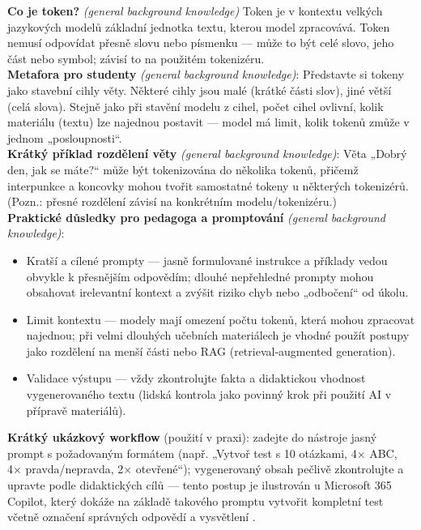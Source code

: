 
\noindent\textbf{Co je token?} \emph{(general background knowledge)} Token je v kontextu velkých jazykových modelů základní jednotka textu, kterou model zpracovává. Token nemusí odpovídat přesně slovu nebo písmenku — může to být celé slovo, jeho část nebo symbol; závisí to na použitém tokenizéru.\\

\noindent\textbf{Metafora pro studenty} \emph{(general background knowledge)}: Představte si tokeny jako stavební cihly věty. Některé cihly jsou malé (krátké části slov), jiné větší (celá slova). Stejně jako při stavění modelu z cihel, počet cihel ovlivní, kolik materiálu (textu) lze najednou postavit — model má limit, kolik tokenů zmůže v jednom „posloupnosti“.\\

\noindent\textbf{Krátký příklad rozdělení věty} \emph{(general background knowledge)}: Věta „Dobrý den, jak se máte?“ může být tokenizována do několika tokenů, přičemž interpunkce a koncovky mohou tvořit samostatné tokeny u některých tokenizérů. (Pozn.: přesné rozdělení závisí na konkrétním modelu/tokenizéru.)\\

\noindent\textbf{Praktické důsledky pro pedagoga a promptování} \emph{(general background knowledge)}:
\begin{itemize}
  \item Kratší a cílené prompty — jasně formulované instrukce a příklady vedou obvykle k přesnějším odpovědím; dlouhé nepřehledné prompty mohou obsahovat irelevantní kontext a zvýšit riziko chyb nebo „odbočení“ od úkolu.
  \item Limit kontextu — modely mají omezení počtu tokenů, která mohou zpracovat najednou; při velmi dlouhých učebních materiálech je vhodné použít postupy jako rozdělení na menší části nebo RAG (retrieval‑augmented generation). 
  \item Validace výstupu — vždy zkontrolujte fakta a didaktickou vhodnost vygenerovaného textu (lidská kontrola jako povinný krok při použití AI v přípravě materiálů).
\end{itemize}

\noindent\textbf{Krátký ukázkový workflow} (použití v praxi): zadejte do nástroje jasný prompt s požadovaným formátem (např. „Vytvoř test s 10 otázkami, 4× ABC, 4× pravda/nepravda, 2× otevřené“); vygenerovaný obsah pečlivě zkontrolujte a upravte podle didaktických cílů — tento postup je ilustrován u Microsoft 365 Copilot, který dokáže na základě takového promptu vytvořit kompletní test včetně označení správných odpovědí a vysvětlení \cite{kb_ai_101_tipu_pdf_04e4a115_page_36_1}.\\

